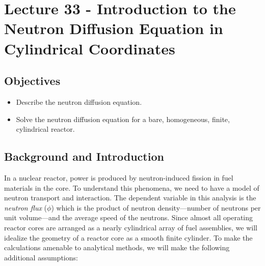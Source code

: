 \chapter{Lecture 33 - Introduction to the Neutron Diffusion Equation in Cylindrical Coordinates}
\label{ch:lec33}
\section{Objectives}
\begin{itemize}
\item Describe the neutron diffusion equation.
\item Solve the neutron diffusion equation for a bare, homogeneous, finite, cylindrical reactor. 
\end{itemize}
\setcounter{lstannotation}{0}

\section{Background and Introduction}
In a nuclear reactor, power is produced by neutron-induced fission in fuel materials in the core.  To understand this phenomena, we need to have a model of neutron transport and interaction.  The dependent variable in this analysis is the \emph{neutron flux} ($\phi$) which is the product of neutron density---number of neutrons per unit volume---and the average speed of the neutrons.  Since almost all operating reactor cores are arranged as a nearly cylindrical array of fuel assemblies, we will idealize the geometry of a reactor core as a smooth finite cylinder.  To make the calculations amenable to analytical methods, we will make the following additional assumptions:
